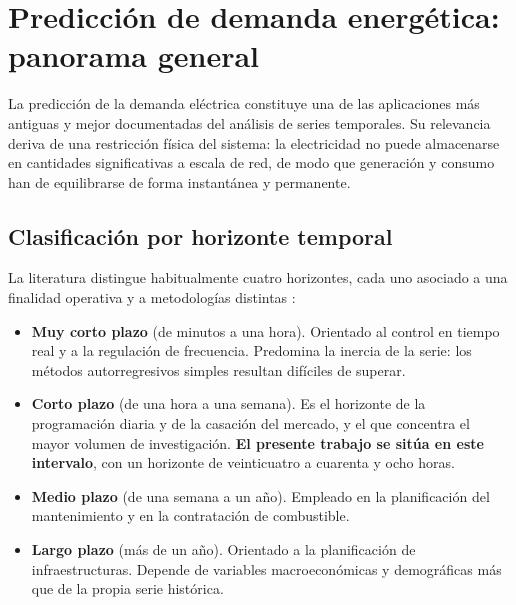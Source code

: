 
\section{Predicción de demanda energética: panorama general}

La predicción de la demanda eléctrica constituye una de las aplicaciones más
antiguas y mejor documentadas del análisis de series temporales. Su relevancia
deriva de una restricción física del sistema: la electricidad no puede almacenarse
en cantidades significativas a escala de red, de modo que generación y consumo
han de equilibrarse de forma instantánea y permanente.

\subsection*{Clasificación por horizonte temporal}

La literatura distingue habitualmente cuatro horizontes, cada uno asociado a una
finalidad operativa y a metodologías distintas
\parencite{hong2016probabilistic}:

\begin{itemize}
  \item \textbf{Muy corto plazo} (de minutos a una hora). Orientado al control en
        tiempo real y a la regulación de frecuencia. Predomina la inercia de la
        serie: los métodos autorregresivos simples resultan difíciles de superar.

  \item \textbf{Corto plazo} (de una hora a una semana). Es el horizonte de la
        programación diaria y de la casación del mercado, y el que concentra el
        mayor volumen de investigación. \textbf{El presente trabajo se sitúa en
        este intervalo}, con un horizonte de veinticuatro a cuarenta y ocho horas.

  \item \textbf{Medio plazo} (de una semana a un año). Empleado en la
        planificación del mantenimiento y en la contratación de combustible.

  \item \textbf{Largo plazo} (más de un año). Orientado a la planificación de
        infraestructuras. Depende de variables macroeconómicas y demográficas más
        que de la propia serie histórica.
\end{itemize}

